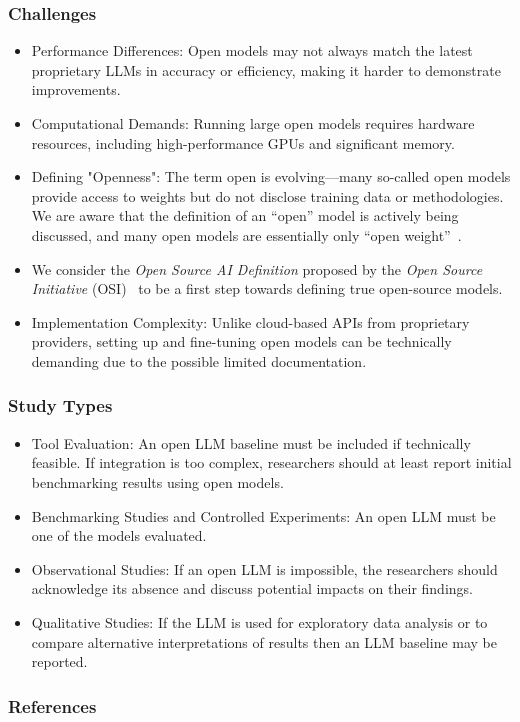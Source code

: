 \subsubsection{Challenges}
\begin{itemize}
    \item Performance Differences: Open models may not always match the latest proprietary LLMs in accuracy or efficiency, making it harder to demonstrate improvements.
    \item Computational Demands: Running large open models requires hardware resources, including high-performance GPUs and significant memory.
    \item Defining "Openness": The term open is evolving—many so-called open models provide access to weights but do not disclose training data or methodologies. We are aware that the definition of an ``open'' model is actively being discussed, and many open models are essentially only ``open weight''~\cite{Gibney2024}.
    \item We consider the \emph{Open Source AI Definition} proposed by the \emph{Open Source Initiative} (OSI)~\cite{OSIAI2024} to be a first step towards defining true open-source models.
    \item Implementation Complexity: Unlike cloud-based APIs from proprietary providers, setting up and fine-tuning open models can be technically demanding due to the possible limited documentation.
\end{itemize}

\subsubsection{Study Types}
\begin{itemize}
    \item Tool Evaluation: An open LLM baseline must be included if technically feasible. If integration is too complex, researchers should at least report initial benchmarking results using open models.
    \item Benchmarking Studies and Controlled Experiments: An open LLM must be one of the models evaluated.
    \item Observational Studies: If an open LLM is impossible, the researchers should acknowledge its absence and discuss potential impacts on their findings.
    \item Qualitative Studies: If the LLM is used for exploratory data analysis or to compare alternative interpretations of results then an LLM baseline may be reported.
\end{itemize}

\subsubsection{References}





